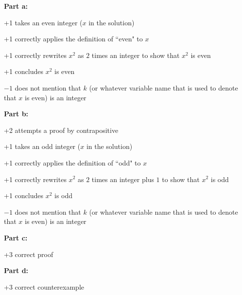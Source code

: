 \documentclass[12pt]{exam}
\begin{document}
\begin{solution}
\textbf{Part a:}
\begin{guidelines}
    \item +1 takes an even integer ($x$ in the solution)
    \item +1 correctly applies the definition of ``even" to $x$
    \item +1 correctly rewrites $x^2$ as $2$ times an integer to show that $x^2$ is even
    \item +1 concludes $x^2$ is even
    \item $-1$ does not mention that $k$ (or whatever variable name that is used to denote that $x$ is even) is an integer
\end{guidelines}
\textbf{Part b:}
\begin{guidelines}
    \item +2 attempts a proof by contrapositive
    \item +1 takes an odd integer ($x$ in the solution)
    \item +1 correctly applies the definition of ``odd" to $x$
    \item +1 correctly rewrites $x^2$ as $2$ times an integer plus $1$ to show that $x^2$ is odd
    \item +1 concludes $x^2$ is odd
    \item $-1$ does not mention that $k$ (or whatever variable name that is used to denote that $x$ is even) is an integer
\end{guidelines}
\textbf{Part c:}
\begin{guidelines}
    \item +3 correct proof
\end{guidelines}
\textbf{Part d:}
\begin{guidelines}
    \item +3 correct counterexample
\end{guidelines}
\end{solution}
\end{document}
